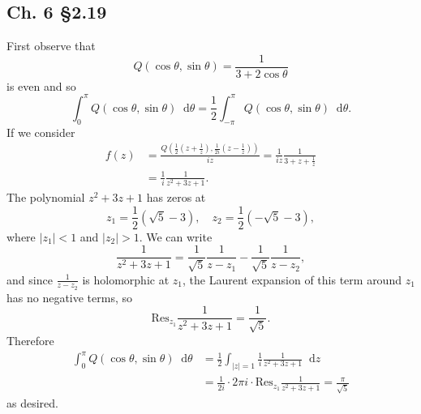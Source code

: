 \documentclass{article}
\newcommand\Res{\mathrm{Res}}
\newcommand\dif{\mathop{}\!\mathrm{d}}
\begin{document}
\subsection{Ch. 6 \S 2.19}
First observe that
$$
  Q(\cos \theta, \sin \theta)
= \frac{1}{3 + 2 \cos \theta}
$$
is even and so
$$
  \int_0^\pi
    Q(\cos \theta, \sin \theta)
    \dif \theta
= \frac{1}{2}
  \int_{-\pi}^{\pi}
    Q(\cos \theta, \sin \theta)
    \dif \theta.
$$
If we consider
\begin{align*}
   f(z)
&= \frac{
     Q
     \left(
       \frac{1}{2}
       \left(
         z + \frac{1}{z}
       \right),
       \frac{1}{2i}
       \left(
         z - \frac{1}{z}
       \right)
     \right)
   }
   {i z}
 = \frac{1}{iz}
   \frac{1}{3 + z + \frac{1}{z}} \\
&= \frac{1}{i}
   \frac{1}{z^2 + 3z + 1}.
\end{align*}
The polynomial $z^2 + 3z + 1$ has zeros at
$$
z_1 = \frac{1}{2}(\sqrt{5} - 3), \quad
z_2 = \frac{1}{2}(-\sqrt{5} - 3),
$$
where $|z_1| < 1$ and $|z_2| > 1$.
We can write
$$
  \frac{1}{z^2 + 3z + 1}
= \frac{1}{\sqrt{5}}
  \frac{1}{z - z_1}
- \frac{1}{\sqrt{5}}
  \frac{1}{z - z_2},
$$
and since $\frac{1}{z - z_2}$ is holomorphic
at $z_1$, the Laurent expansion of this term around
$z_1$ has no negative terms, so
$$
  \Res_{z_1}
    \frac{1}{z^2 + 3z + 1}
= \frac{1}{\sqrt{5}}.
$$
Therefore
\begin{align*}
   \int_0^\pi
     Q(\cos \theta, \sin \theta)
     \dif \theta
&= \frac{1}{2}
   \int_{|z| = 1}
     \frac{1}{i}
     \frac{1}{z^2 + 3z + 1}
     \dif z \\
&= \frac{1}{2i} \cdot
   2 \pi i \cdot
   \Res_{z_1}
     \frac{1}{z^2 + 3z + 1}
 = \frac{\pi}{\sqrt{5}}
\end{align*}
as desired.
\end{document}
